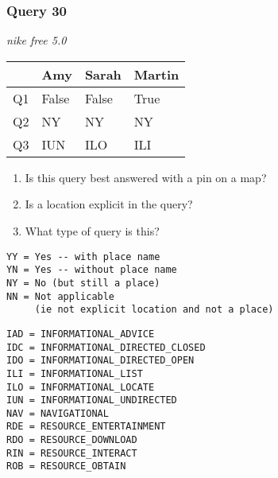 \begin{frame}[fragile]
\frametitle{Query 30}
\vspace{1em}

\emph{nike free 5.0}

\vfill

\begin{table}
  \centering
  \begin{tabular}{ l l l l }
    & \textbf{Amy} & \textbf{Sarah} & \textbf{Martin}\\
    \toprule
    Q1 & False & False & True\\
Q2 & NY & NY & NY\\
Q3 & IUN & ILO & ILI\\
    \bottomrule
  \end{tabular}
\end{table}

\vfill

\tiny{

\begin{enumerate}
\item Is this query best answered with a pin on a map?
\item Is a location explicit in the query?
\item What type of query is this?
\end{enumerate}

\vfill

\begin{multicols}{2}
\begin{verbatim}
YY = Yes -- with place name
YN = Yes -- without place name
NY = No (but still a place)
NN = Not applicable 
     (ie not explicit location and not a place)
\end{verbatim}

\columnbreak
\begin{verbatim}
IAD = INFORMATIONAL_ADVICE
IDC = INFORMATIONAL_DIRECTED_CLOSED
IDO = INFORMATIONAL_DIRECTED_OPEN
ILI = INFORMATIONAL_LIST
ILO = INFORMATIONAL_LOCATE
IUN = INFORMATIONAL_UNDIRECTED
NAV = NAVIGATIONAL
RDE = RESOURCE_ENTERTAINMENT
RDO = RESOURCE_DOWNLOAD
RIN = RESOURCE_INTERACT
ROB = RESOURCE_OBTAIN
\end{verbatim}
\end{multicols}
}

\end{frame}


